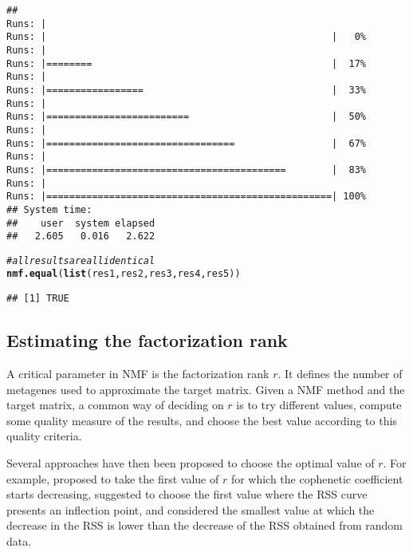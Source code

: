 \documentclass[a4paper]{article}\usepackage[]{graphicx}\usepackage[]{color}
\makeatletter
\newcommand{\hlcom}[1]{\textcolor[rgb]{0.678,0.584,0.686}{\textit{#1}}}%
\newcommand{\hlstd}[1]{\textcolor[rgb]{0.345,0.345,0.345}{#1}}%
\newcommand{\hlkwd}[1]{\textcolor[rgb]{0.737,0.353,0.396}{\textbf{#1}}}%
\newenvironment{kframe}{%
 \def\at@end@of@kframe{}%
 \ifinner\ifhmode%
  \def\at@end@of@kframe{\end{minipage}}%
  \begin{minipage}{\columnwidth}%
 \fi\fi%
 \def\FrameCommand##1{\hskip\@totalleftmargin \hskip-\fboxsep
 \colorbox{shadecolor}{##1}\hskip-\fboxsep
     \hskip-\linewidth \hskip-\@totalleftmargin \hskip\columnwidth}%
 \MakeFramed {\advance\hsize-\width
   \@totalleftmargin\z@ \linewidth\hsize
   \@setminipage}}%
 {\par\unskip\endMakeFramed%
 \at@end@of@kframe}
\newenvironment{knitrout}{}{} %
\renewcommand{\cite}[1]{\parencite{#1}}
\makeatother
\begin{document}
\begin{knitrout}
\begin{kframe}
{\ttfamily\noindent\itshape\color{messagecolor}{\#\# NMF algorithm: 'brunet'\\\#\# Multiple runs: 5\\\#\# Mode: sequential [foreach:doSEQ]}}\begin{verbatim}
## 
Runs: |                                                        
Runs: |                                                  |   0%
Runs: |                                                        
Runs: |========                                          |  17%
Runs: |                                                        
Runs: |=================                                 |  33%
Runs: |                                                        
Runs: |=========================                         |  50%
Runs: |                                                        
Runs: |=================================                 |  67%
Runs: |                                                        
Runs: |==========================================        |  83%
Runs: |                                                        
Runs: |==================================================| 100%
## System time:
##    user  system elapsed 
##   2.605   0.016   2.622
\end{verbatim}
\begin{alltt}
\hlcom{# all results are all identical}
\hlkwd{nmf.equal}\hlstd{(}\hlkwd{list}\hlstd{(res1, res2, res3, res4, res5))}
\end{alltt}
\begin{verbatim}
## [1] TRUE
\end{verbatim}
\end{kframe}
\end{knitrout}


\subsection{Estimating the factorization rank}
A critical parameter in NMF is the factorization rank $r$. 
It defines the number of metagenes used to approximate the target matrix.
Given a NMF method and the target matrix, a common way of deciding on $r$ is to try different values, compute some quality measure of the results, and choose the best value according to this quality criteria.

Several approaches have then been proposed to choose the optimal value of $r$.
For example, \cite{Brunet2004} proposed to take the first value of $r$ for which the cophenetic coefficient starts decreasing, \cite{Hutchins2008} suggested to choose the first value where the RSS curve presents an inflection point, and \cite{Frigyesi2008} considered the smallest value at which the decrease in the RSS is lower than the decrease of the RSS obtained from random data.
\end{document}

